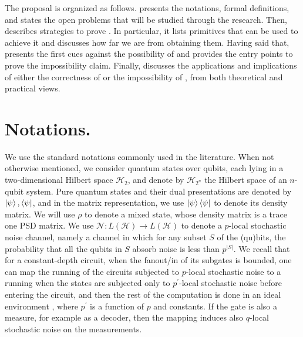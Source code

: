 \documentclass[manuscript,screen,review]{acmart}
\begin{document}
{  
  
The proposal is organized as follows.  presents the notations, formal definitions, and states the open problems that will be studied through the research. Then,  describes strategies to prove \CDO{}. In particular, it lists primitives that can be used to achieve it and discusses how far we are from obtaining them. Having said that,  presents the first cues against the possibility of \CDO{} and provides the entry points to prove the impossibility claim. Finally,  discusses the applications and implications of either the correctness of \CDO{} or the impossibility of \CDO{}, from both theoretical and practical views.


  \section{ Notations. } \label{sec:nota}

  We use the standard notations commonly used in the literature. When not otherwise mentioned, we consider quantum states over qubits, each lying in a two-dimensional Hilbert space $\mathcal{H}_{2}$, and denote by $\mathcal{H}_{2^n}$ the Hilbert space of an $n$-qubit system. Pure quantum states and their dual presentations are denoted by $\ket{\psi}, \bra{\psi}$, and in the matrix representation, we use $\ket{\psi}\bra{\psi}$ to denote its density matrix. We will use $\rho$ to denote a mixed state, whose density matrix is a trace one PSD matrix. We use $\mathcal{N} : L(\mathcal{H}) \rightarrow L(\mathcal{H})$ to denote a $p$-local stochastic noise channel, namely a channel in which for any subset $S$ of the (qu)bits, the probability that all the qubits in $S$ absorb noise is less than $p^{|S|}$. We recall that for a constant-depth circuit, when the fanout/in of its subgates is bounded, one can map the running of the circuits subjected to $p$-local stochastic noise to a running when the states are subjected only to $p^{\prime}$-local stochastic noise before entering the circuit, and then the rest of the computation is done in an ideal environment \cite{gottesman2014faulttolerant}, where $p^{\prime}$ is a function of $p$ and constants. If the gate is also a measure, for example as a decoder, then the mapping induces also $q$-local stochastic noise on the measurements.

}
\end{document}
